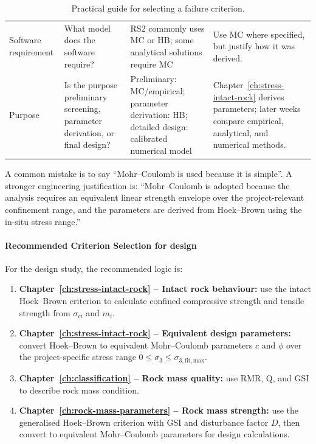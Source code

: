 \begin{table}[H]
\begin{tabularx}{\textwidth}{l Y Y Y}
Software requirement
& What model does the software require?
& RS2 commonly uses MC or HB; some analytical solutions require MC
& Use MC where specified, but justify how it was derived. \\

Purpose
& Is the purpose preliminary screening, parameter derivation, or final design?
& Preliminary: MC/empirical; parameter derivation: HB; detailed design: calibrated numerical model
& Chapter~\ref{ch:stress-intact-rock} derives parameters; later weeks compare empirical, analytical, and numerical methods. \\
\bottomrule
\end{tabularx}
\caption{Practical guide for selecting a failure criterion.}
\label{tab:criterion_selection}
\end{table}

\begin{warnbox}
A common mistake is to say ``Mohr--Coulomb is used because it is simple''. A stronger
engineering justification is: ``Mohr--Coulomb is adopted because the analysis requires an
equivalent linear strength envelope over the project-relevant confinement range, and the
parameters are derived from Hoek--Brown using the in-situ stress range.''
\end{warnbox}

\paragraph{Recommended Criterion Selection for design}

For the design study, the recommended logic is:

\begin{enumerate}
 \item \textbf{ Chapter~\ref{ch:stress-intact-rock} -- Intact rock behaviour:}
 use the intact Hoek--Brown criterion to calculate confined compressive strength and
 tensile strength from \(\sigma_{ci}\) and \(m_i\).
 
 \item \textbf{ Chapter~\ref{ch:stress-intact-rock} -- Equivalent design parameters:}
 convert Hoek--Brown to equivalent Mohr--Coulomb parameters \(c\) and \(\phi\) over
 the project-specific stress range \(0 \leq \sigma_3 \leq \sigma_{3,\mathrm{fit,max}}\).
 
 \item \textbf{ Chapter~\ref{ch:classification} -- Rock mass quality:}
 use RMR, Q, and GSI to describe rock mass condition.
 
 \item \textbf{ Chapter~\ref{ch:rock-mass-parameters} -- Rock mass strength:}
 use the generalised Hoek--Brown criterion with GSI and disturbance factor \(D\), then
 convert to equivalent Mohr--Coulomb parameters for design calculations.
\end{enumerate}

